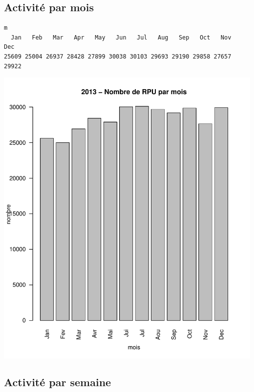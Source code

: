 \documentclass[12pt,english,french,twoside]{book}\usepackage[]{graphicx}\usepackage[]{color}
\makeatletter
\def\maxwidth{ %
  \ifdim\Gin@nat@width>\linewidth
    \linewidth
  \else
    \Gin@nat@width
  \fi
}
\newenvironment{kframe}{%
 \def\at@end@of@kframe{}%
 \ifinner\ifhmode%
  \def\at@end@of@kframe{\end{minipage}}%
  \begin{minipage}{\columnwidth}%
 \fi\fi%
 \def\FrameCommand##1{\hskip\@totalleftmargin \hskip-\fboxsep
 \colorbox{shadecolor}{##1}\hskip-\fboxsep
     \hskip-\linewidth \hskip-\@totalleftmargin \hskip\columnwidth}%
 \MakeFramed {\advance\hsize-\width
   \@totalleftmargin\z@ \linewidth\hsize
   \@setminipage}}%
 {\par\unskip\endMakeFramed%
 \at@end@of@kframe}
\newenvironment{knitrout}{}{} %
\makeatother
\begin{document}
\subsection*{Activité par mois}
\begin{knitrout}
\color{fgcolor}\begin{kframe}
\begin{verbatim}
m
  Jan   Feb   Mar   Apr   May   Jun   Jul   Aug   Sep   Oct   Nov   Dec 
25609 25004 26937 28428 27899 30038 30103 29693 29190 29858 27657 29922 
\end{verbatim}
\end{kframe}
\includegraphics[width=\maxwidth]{figure/parmois} 

\end{knitrout}


\subsection*{Activité par semaine}
\end{document}
